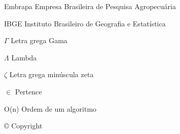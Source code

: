\listoffigures*
\cleardoublepage

\listoftables*
\cleardoublepage

\begin{siglas}
  \item[Embrapa] Empresa Brasileira de Pesquisa Agropecuária
  \item[IBGE] Instituto Brasileiro de Geografia e Estatística
\end{siglas}

\begin{simbolos}
  \item[$ \Gamma $] Letra grega Gama
  \item[$ \Lambda $] Lambda
  \item[$ \zeta $] Letra grega minúscula zeta
  \item[$ \in $] Pertence
  \item[O(n)] Ordem de um algoritmo
  \item[©] Copyright
\end{simbolos}

\tableofcontents*
\cleardoublepage